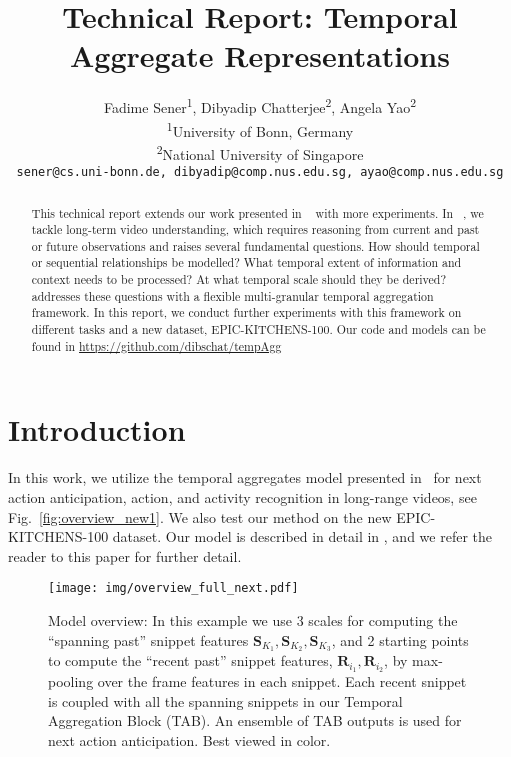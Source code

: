 \documentclass[10pt,twocolumn,letterpaper]{article}
\begin{document}
 
\title{Technical Report: Temporal Aggregate Representations}

\author{Fadime Sener\textsuperscript{1}, Dibyadip Chatterjee\textsuperscript{2}, Angela Yao\textsuperscript{2}\\
\textsuperscript{1}University of Bonn, Germany \\
\textsuperscript{2}National University of Singapore \\
{\tt\small sener@cs.uni-bonn.de, dibyadip@comp.nus.edu.sg, ayao@comp.nus.edu.sg} 
}

\maketitle 

\begin{abstract}

This technical report extends our work presented in ~\cite{sener2020temporal} with more experiments.
In ~\cite{sener2020temporal}, we tackle long-term video understanding, which requires reasoning from current and past or future observations and raises several fundamental questions.
How should temporal or sequential relationships be modelled?
What temporal extent of information and context needs to be processed? 
At what temporal scale should they be derived?
~\cite{sener2020temporal} addresses these questions with a flexible multi-granular temporal aggregation framework.
In this report, we conduct further experiments with this framework on different tasks and a new dataset, EPIC-KITCHENS-100. 
Our code and models can be found in {\url{https://github.com/dibschat/tempAgg}} 

\end{abstract}

\section{Introduction}
In this work, we utilize the temporal aggregates model presented in~\cite{sener2020temporal} for next action anticipation, action, and activity recognition in long-range videos, see Fig.~\ref{fig:overview_new1}. 
We also test our method on the new EPIC-KITCHENS-100 dataset. 
Our model is described in detail in \cite{sener2020temporal}, and we refer the reader to this paper for further detail.


\begin{figure} 
\centering 
 \texttt{[image: img/overview\_full\_next.pdf]}
\caption{
Model overview: In this example we use 3 scales for computing the ``spanning past'' snippet features $\mathbf{S}_{K_1}, \mathbf{S}_{K_2}, \mathbf{S}_{K_3}$, and 2 starting points to compute the ``recent past'' snippet features, $\mathbf{R}_{i_1}, \mathbf{R}_{i_2}$, by max-pooling over the frame features in each snippet. 
Each recent snippet is coupled with all the spanning snippets in our Temporal Aggregation Block (TAB). 
An ensemble of TAB outputs is used for next action anticipation. 
Best viewed in color.
}
\label{fig:overview_new}
\end{figure}
\end{document}
